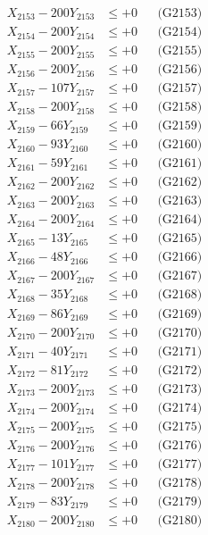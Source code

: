 \documentclass[a4paper,10pt]{article}
\begin{document}
{\begin{align}
X_{2153} - 200Y_{2153} &\leq +0 && \text{(G2153)} \\
X_{2154} - 200Y_{2154} &\leq +0 && \text{(G2154)} \\
X_{2155} - 200Y_{2155} &\leq +0 && \text{(G2155)} \\
X_{2156} - 200Y_{2156} &\leq +0 && \text{(G2156)} \\
X_{2157} - 107Y_{2157} &\leq +0 && \text{(G2157)} \\
X_{2158} - 200Y_{2158} &\leq +0 && \text{(G2158)} \\
X_{2159} - 66Y_{2159} &\leq +0 && \text{(G2159)} \\
X_{2160} - 93Y_{2160} &\leq +0 && \text{(G2160)} \\
\allowbreak
X_{2161} - 59Y_{2161} &\leq +0 && \text{(G2161)} \\
X_{2162} - 200Y_{2162} &\leq +0 && \text{(G2162)} \\
X_{2163} - 200Y_{2163} &\leq +0 && \text{(G2163)} \\
X_{2164} - 200Y_{2164} &\leq +0 && \text{(G2164)} \\
X_{2165} - 13Y_{2165} &\leq +0 && \text{(G2165)} \\
X_{2166} - 48Y_{2166} &\leq +0 && \text{(G2166)} \\
X_{2167} - 200Y_{2167} &\leq +0 && \text{(G2167)} \\
X_{2168} - 35Y_{2168} &\leq +0 && \text{(G2168)} \\
X_{2169} - 86Y_{2169} &\leq +0 && \text{(G2169)} \\
X_{2170} - 200Y_{2170} &\leq +0 && \text{(G2170)} \\
\allowbreak
X_{2171} - 40Y_{2171} &\leq +0 && \text{(G2171)} \\
X_{2172} - 81Y_{2172} &\leq +0 && \text{(G2172)} \\
X_{2173} - 200Y_{2173} &\leq +0 && \text{(G2173)} \\
X_{2174} - 200Y_{2174} &\leq +0 && \text{(G2174)} \\
X_{2175} - 200Y_{2175} &\leq +0 && \text{(G2175)} \\
X_{2176} - 200Y_{2176} &\leq +0 && \text{(G2176)} \\
X_{2177} - 101Y_{2177} &\leq +0 && \text{(G2177)} \\
X_{2178} - 200Y_{2178} &\leq +0 && \text{(G2178)} \\
X_{2179} - 83Y_{2179} &\leq +0 && \text{(G2179)} \\
X_{2180} - 200Y_{2180} &\leq +0 && \text{(G2180)} \\

\end{align}}
\end{document}
